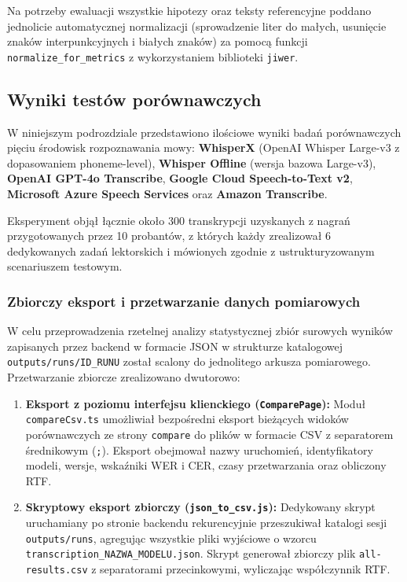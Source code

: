 Na potrzeby ewaluacji wszystkie hipotezy oraz teksty referencyjne poddano jednolicie automatycznej normalizacji (sprowadzenie liter do małych, usunięcie znaków interpunkcyjnych i białych znaków) za pomocą funkcji \texttt{normalize\_for\_metrics} z wykorzystaniem biblioteki \texttt{jiwer}.



\subsection{Wyniki testów porównawczych}
\label{subsec:benchmark_results}

W niniejszym podrozdziale przedstawiono ilościowe wyniki badań porównawczych pięciu środowisk rozpoznawania mowy: \textbf{WhisperX} (OpenAI Whisper Large-v3 z dopasowaniem phoneme-level), \textbf{Whisper Offline} (wersja bazowa Large-v3), \textbf{OpenAI GPT-4o Transcribe}, \textbf{Google Cloud Speech-to-Text v2}, \textbf{Microsoft Azure Speech Services} oraz \textbf{Amazon Transcribe}.

Eksperyment objął łącznie około $300$ transkrypcji uzyskanych z nagrań przygotowanych przez 10 probantów, z których każdy zrealizował 6 dedykowanych zadań lektorskich i mówionych zgodnie z ustrukturyzowanym scenariuszem testowym.

\subsubsection{Zbiorczy eksport i przetwarzanie danych pomiarowych}
\label{subsubsec:data_aggregation}

W celu przeprowadzenia rzetelnej analizy statystycznej zbiór surowych wyników zapisanych przez backend w formacie JSON w strukturze katalogowej \texttt{outputs/runs/ID\_RUNU} został scalony do jednolitego arkusza pomiarowego. Przetwarzanie zbiorcze zrealizowano dwutorowo:

\begin{enumerate}
    \item \textbf{Eksport z poziomu interfejsu klienckiego (\texttt{ComparePage}):} Moduł \texttt{compareCsv.ts} umożliwiał bezpośredni eksport bieżących widoków porównawczych ze strony \texttt{compare} do plików w formacie CSV z separatorem średnikowym (\texttt{;}). Eksport obejmował nazwy uruchomień, identyfikatory modeli, wersje, wskaźniki WER i CER, czasy przetwarzania oraz obliczony RTF.
    \item \textbf{Skryptowy eksport zbiorczy (\texttt{json\_to\_csv.js}):} Dedykowany skrypt uruchamiany po stronie backendu rekurencyjnie przeszukiwał katalogi sesji \texttt{outputs/runs}, agregując wszystkie pliki wyjściowe o wzorcu \texttt{transcription\_NAZWA\_MODELU.json}. Skrypt generował zbiorczy plik \texttt{all-results.csv} z separatorami przecinkowymi, wyliczając współczynnik RTF.
\end{enumerate}

